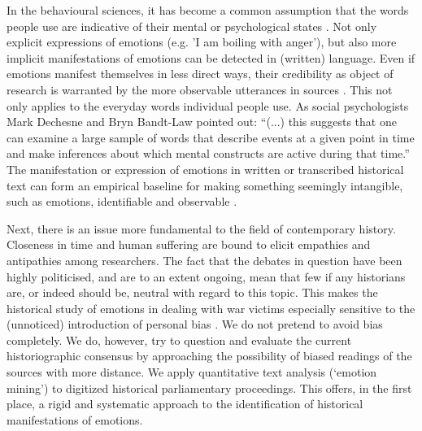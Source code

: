 \documentclass{dhbenelux}
\begin{document}
In the behavioural sciences, it has become a common assumption that the words people use are indicative of their mental or psychological states \citep{tausczik_psychological_2010}. Not only explicit expressions of emotions (e.g. 'I am boiling with anger'), but also more implicit manifestations of emotions can be detected in (written) language. Even if emotions manifest themselves in less direct ways, their credibility as object of research is warranted by the more observable utterances in sources \citep{ross_mixed_2013}. This not only applies to the everyday words individual people use. As social psychologists Mark Dechesne and Bryn Bandt-Law pointed out: ``(...) this suggests that one can examine a large sample of words that describe events at a given point in time and make inferences about which mental constructs are active during that time.'' \citep[p.3]{dechesne_terror_2019}  The manifestation or expression of emotions in written or transcribed historical text can form an empirical baseline for making something seemingly intangible, such as emotions, identifiable and observable \citep{boot_dutch_2017}.

Next, there is an issue more fundamental to the field of contemporary history. Closeness in time and human suffering are bound to elicit empathies and antipathies among researchers. The fact that the debates in question have been highly politicised, and are to an extent ongoing, mean that few if any historians are, or indeed should be, neutral with regard to this topic. This makes the historical study of emotions in dealing with war victims especially sensitive to the (unnoticed) introduction of personal bias \citep{tonkin_working_2016}. We do not pretend to avoid bias completely. We do, however, try to question and evaluate the current historiographic consensus by approaching the possibility of biased readings of the sources with more distance. We apply quantitative text analysis (‘emotion mining’) to digitized historical parliamentary proceedings. This offers, in the first place, a rigid and systematic approach to the identification of historical manifestations of emotions.
\end{document}
